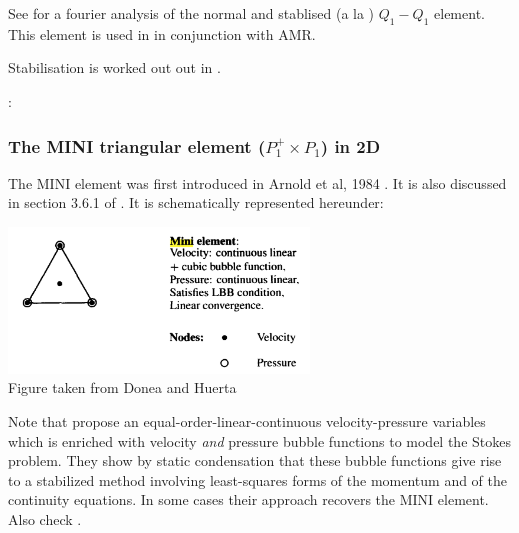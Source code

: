 \begin{minipage}[t]{0.5\textwidth}

\end{minipage}
\begin{minipage}[t]{0.5\textwidth}

\end{minipage}

See \cite{nosi01} for a fourier analysis of the normal and stablised (a la \cite{hufb86}) $Q_1-Q_1$ element.
This element is used in \cite{bugs09,busa13} in conjunction with AMR. 

Stabilisation is worked out out in \cite{dobo04,bodg06}.

\Literature: \cite{grcc95,knto00,fros07}


\subsubsection{The MINI triangular element ($P_1^+\times P_1$) in 2D}
\label{pair:mini}

The  MINI element was first introduced in Arnold et al, 1984 \cite{arbf84}.
It is also discussed in section 3.6.1 of \cite{john16}.
It is schematically represented hereunder:

\begin{center}
\includegraphics[width=8cm]{images/mini/minielement}\\
{\captionfont Figure taken from Donea and Huerta \cite{dohu03}}
\end{center}

\begin{remark}
Note that \cite{frol03} propose an equal-order-linear-continuous velocity-pressure variables which is enriched 
with velocity {\it and} pressure bubble functions to model the Stokes problem. They show by static condensation that
these bubble functions give rise to a stabilized method involving least-squares forms of the momentum and of the
continuity equations. In some cases their approach recovers the MINI element. Also check \cite{gamt08}.
\end{remark}

